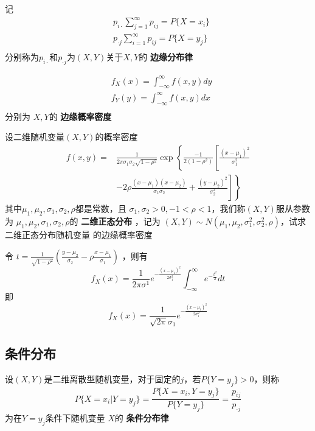 \documentclass[11pt]{article}
\begin{document}
记
\begin{align*}
&p_{i\cdot}\sum_{j=1}^\infty p_{ij}=P\{X=x_i\}\\
&p_{\cdot j}\sum_{i=1}^\infty p_{ij}=P\{X=y_j\}\\
\end{align*}
分别称为\(p_{i\cdot}\)和\(p_{\cdot j}\)为\((X,Y)\)关于\(X,Y\)的 \textbf{边缘分布律}


\begin{align*}
&f_X(x)=\int_{-\infty}^\infty f(x,y)dy\\
&f_Y(y)=\int_{-\infty}^\infty f(x,y)dx\\
\end{align*}
分别为 \(X,Y\)的 \textbf{边缘概率密度}
\begin{examplle}[]
设二维随机变量\((X,Y)\)的概率密度
\begin{align*}
f(x,y)=&
\frac{1}{2\pi\sigma_1\sigma_2\sqrt{1-\rho^2}}\exp\left\{
\frac{-1}{2(1-\rho^2)}\left[
\frac{(x-\mu_1)^2}{\sigma_1^2}\right.\right.\\
&\left.\left.
-2\rho\frac{(x-\mu_1)(x-\mu_2)}{\sigma_1\sigma_2}+
\frac{(y-\mu_2)^2}{\sigma_2^2}
\right]
\right\}
\end{align*}
其中\(\mu_1,\mu_2,\sigma_1,\sigma_2,\rho\)都是常数，且
\(\sigma_1,\sigma_2>0,-1<\rho<1\)，我们称\((X,Y)\)服从参数为
\(\mu_1,\mu_2,\sigma_1,\sigma_2,\rho\)的 \textbf{二维正态分布} ，记为
\((X,Y)\sim N(\mu_1,\mu_2,\sigma_1^2,\sigma_2^2,\rho)\)，试求二维正态分布随机变量
的边缘概率密度

令
\(t=\frac{1}{\sqrt{1-\rho^2}}(\frac{y-\mu_2}{\sigma_2}-\rho\frac{x-\mu_1}{\sigma_1})\)
，则有
\begin{equation*}
f_X(x)=\frac{1}{2\pi\sigma^1}e^{-\frac{(x-\mu_1)^2}{2\sigma_1^2}}
\int_{-\infty}^\infty e^{-\frac{t^2}{2}}dt
\end{equation*}
即
\begin{equation*}
f_X(x)=\frac{1}{\sqrt{2\pi}\sigma_1}e^{-\frac{(x-\mu_1)^2}{2\sigma_1^2}}
\end{equation*}
\end{examplle}
\subsection{条件分布}
\label{sec:org749796e}
\begin{definition}[]
设\((X,Y)\)是二维离散型随机变量，对于固定的\(j\)，若\(P\{Y=y_j\}>0\)，则称
\begin{equation*}
P\{X=x_i|Y=y_j\}=\frac{P\{X=x_i,Y=y_j\}}{P\{Y=y_j\}}=\frac{p_{ij}}{p_{\cdot j}}
\end{equation*}
为在\(Y=y_j\)条件下随机变量 \(X\)的 \textbf{条件分布律}
\end{definition}
\end{document}
